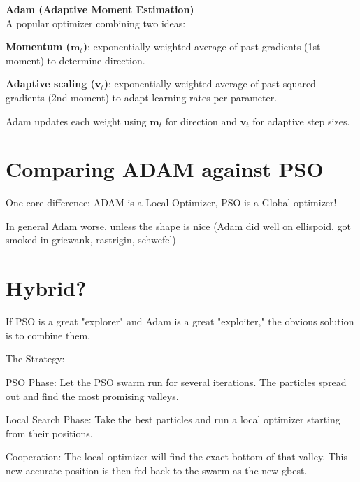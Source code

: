 \textbf{Adam (Adaptive Moment Estimation)}\\
A popular optimizer combining two ideas:
\begin{tightitemize}
    \item \textbf{Momentum ($\mathbf{m}_t$)}: exponentially weighted average of past gradients (1st moment) to determine direction.
    \item \textbf{Adaptive scaling ($\mathbf{v}_t$)}: exponentially weighted average of past squared gradients (2nd moment) to adapt learning rates per parameter.
\end{tightitemize}
Adam updates each weight using $\mathbf{m}_t$ for direction and $\mathbf{v}_t$ for adaptive step sizes.

\section*{Comparing ADAM against PSO}

One core difference: ADAM is a Local Optimizer, PSO is a Global optimizer!

In general Adam worse, unless the shape is nice (Adam did well on ellispoid, got smoked in 
griewank, rastrigin, schwefel)

\section*{Hybrid?}

If PSO is a great "explorer" and Adam is a great "exploiter," the obvious solution is to combine them.
    
The Strategy:
\begin{tightitemize}
    \item PSO Phase: Let the PSO swarm run for several iterations. 
    The particles spread out and find the most promising valleys.
    \item Local Search Phase: 
    Take the best particles and run a local optimizer starting from their positions.
    \item Cooperation: The local optimizer  will find the exact bottom of that valley. 
    This new accurate position is then fed back to the swarm as the new gbest.
\end{tightitemize}
        

        

        